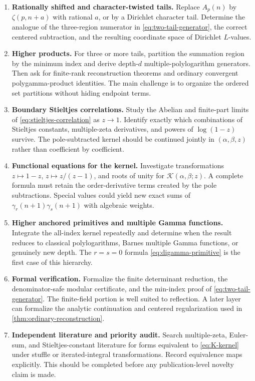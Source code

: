 \documentclass[11pt]{article}
\theoremstyle{definition}
\newcommand{\K}{\mathcal{K}}
\begin{document}
\begin{enumerate}[label=\textbf{R\arabic*.},leftmargin=*]
\item \textbf{Rationally shifted and character-twisted tails.}
Replace $A_p(n)$ by $\zeta(p,n+a)$ with rational $a$, or by a Dirichlet
character tail.  Determine the analogue of the three-region numerator
in \eqref{eq:two-tail-generator}, the correct centered subtraction, and
the resulting coordinate space of Dirichlet $L$-values.

\item \textbf{Higher products.}
For three or more tails, partition the summation region by the minimum
index and derive depth-$d$ multiple-polylogarithm generators.  Then ask
for finite-rank reconstruction theorems and ordinary convergent
polygamma-product identities.  The main challenge is to organize the
ordered set partitions without hiding endpoint terms.

\item \textbf{Boundary Stieltjes correlations.}
Study the Abelian and finite-part limits of
\eqref{eq:stieltjes-correlation} as $z\to1$.  Identify exactly which
combinations of Stieltjes constants, multiple-zeta derivatives, and
powers of $\log(1-z)$ survive.  The pole-subtracted kernel should be
continued jointly in $(\alpha,\beta,z)$ rather than coefficient by
coefficient.

\item \textbf{Functional equations for the kernel.}
Investigate transformations $z\mapsto1-z$, $z\mapsto z/(z-1)$, and
roots of unity for $\K(\alpha,\beta;z)$.  A complete formula must retain
the order-derivative terms created by the pole subtractions.  Special
values could yield new exact sums of
$\gamma_r(n+1)\gamma_s(n+1)$ with algebraic weights.

\item \textbf{Higher anchored primitives and multiple Gamma functions.}
Integrate the all-index kernel repeatedly and determine when the result
reduces to classical polylogarithms, Barnes multiple Gamma functions,
or genuinely new depth.  The $r=s=0$ formula
\eqref{eq:digamma-primitive} is the first case of this hierarchy.

\item \textbf{Formal verification.}
Formalize the finite determinant reduction, the denominator-safe modular
certificate, and the min-index proof of
\eqref{eq:two-tail-generator}.  The finite-field portion is well suited
to reflection.  A later layer can formalize the analytic continuation
and centered regularization used in
\cref{thm:ordinary-reconstruction}.

\item \textbf{Independent literature and priority audit.}
Search multiple-zeta, Euler-sum, and Stieltjes-constant literature for
forms equivalent to \eqref{eq:K-kernel} under stuffle or iterated-integral
transformations.  Record equivalence maps explicitly.  This should be
completed before any publication-level novelty claim is made.
\end{enumerate}
 \appendix
\end{document}
